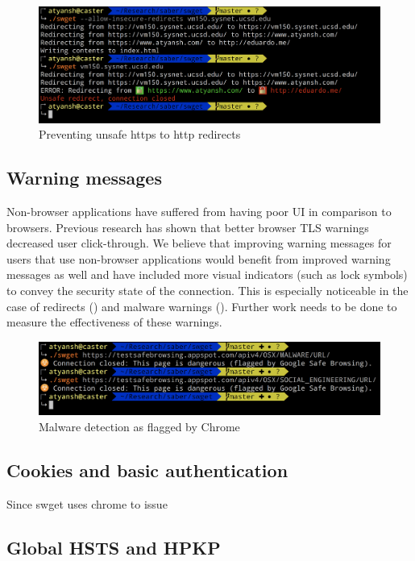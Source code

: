 \begin{figure}[h]
  \includegraphics[width=\textwidth]{figures/redirect}
  \caption{Preventing unsafe https to http redirects} 
  \label{fig:redirect-saber}
\end{figure}

\subsection{Warning messages}
Non-browser applications have suffered from having poor UI in comparison to
browsers. Previous research has shown that better browser TLS warnings
decreased user click-through. We believe that improving warning messages for
users that use non-browser applications would benefit from improved warning
messages as well and have included more visual indicators (such as lock symbols)
to convey the security state of the connection. This is especially noticeable
in the case of redirects () and malware warnings
(). Further work needs to be done to measure the
effectiveness of these warnings.

\begin{figure}[h]
  \includegraphics[width=\textwidth]{figures/malware}
  \caption{Malware detection as flagged by Chrome} 
  \label{fig:malware-saber}
\end{figure}

\subsection{Cookies and basic authentication}
Since swget uses chrome to issue 

\subsection{Global HSTS and HPKP}


